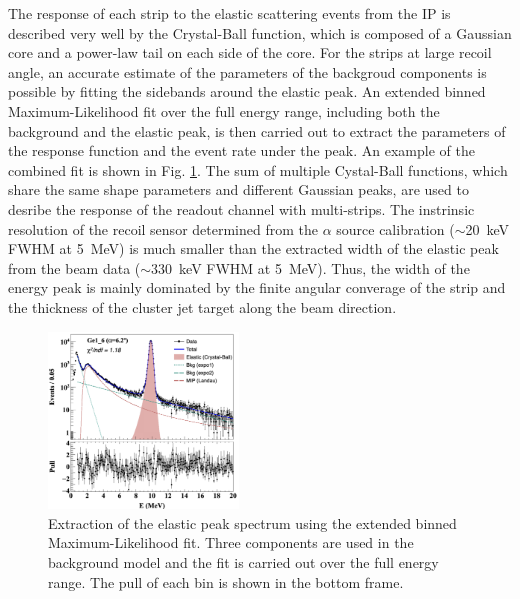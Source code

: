 \documentclass[number,5p]{elsarticle}
\begin{document}
The response of each strip to the elastic scattering events from the IP is described
very well by the Crystal-Ball function\cite{crystal_ball}, which is composed of a Gaussian core and a power-law tail on each side of the core.
For the strips at large recoil angle, an accurate estimate of the parameters of
the backgroud components is possible by fitting the sidebands around the elastic peak.
An extended binned Maximum-Likelihood fit over the full energy range, including both the background and the
elastic peak, is then carried out to extract the parameters of the response function and the event rate under the peak.
An example of the combined fit is shown in Fig. \ref{fig:e_fit}.
The sum of multiple Cystal-Ball functions, which share the same shape parameters and
different Gaussian peaks, are used to desribe the response of the readout channel with multi-strips. 
The instrinsic resolution of the recoil sensor determined from the $\alpha$ source
calibration ($\sim$\SI{20}{\keV} FWHM at \SI{5}{\MeV}) is much smaller than the
extracted width of the elastic peak from the beam data ($\sim$\SI{330}{\keV}
FWHM at \SI{5}{\MeV}).
Thus, the width of the energy peak is mainly dominated by the finite
angular converage of the strip and the thickness of the cluster jet target along the beam direction.
\begin{figure}[tb!]
  \centering
  \includegraphics[width=0.45\textwidth]{./e_fit.png}
  \caption{Extraction of the elastic peak spectrum using the extended binned
    Maximum-Likelihood fit. Three components are used in the background model
    and the fit is carried out over the full energy range. The pull of each bin
    is shown in the bottom frame.}
  \label{fig:e_fit}
\end{figure}
\end{document}
